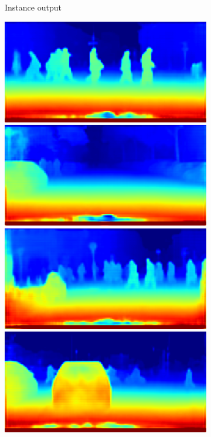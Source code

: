\begin{figure}[t]
{\begin{subfigure}[t]{0.24\linewidth}
\begin{center}
  \caption{Instance output}
\end{center}
\end{subfigure}
\begin{subfigure}[t]{0.24\linewidth}
\begin{center}
		\includegraphics[width=\linewidth,trim={0px 60px 0 0px},clip]{results/segnet_107_output_4.png}
		\includegraphics[width=\linewidth,trim={0px 60px 0 0px},clip]{results/segnet_186_output_4.png}
		\includegraphics[width=\linewidth,trim={0px 60px 0 0px},clip]{results/segnet_242_output_4.png}
		\includegraphics[width=\linewidth,trim={0px 60px 0 0px},clip]{results/segnet_209_output_4.png}

\end{center}
\end{subfigure}}
\end{figure}
